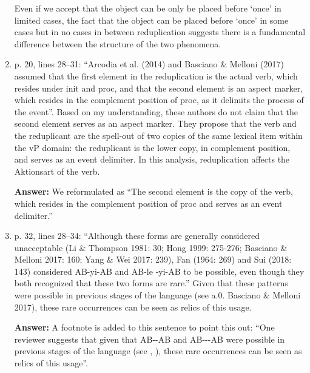 \documentclass[fleqn,twoside]{article}
\begin{document}
\begin{enumerate}
Even if we accept that the object can be only be placed before    `once' in limited cases,
the fact that the object can be placed before    `once' in some cases but in no cases in between reduplication suggests there is a fundamental difference between the structure of the two phenomena.

\item
p. 20, lines 28--31: “Arcodia et al. (2014) and Basciano \& Melloni (2017) assumed that the first
element in the reduplication is the actual verb, which resides under init and proc, and that the
second element is an aspect marker, which resides in the complement position of proc, as it delimits
the process of the event”. Based on my understanding, these authors do not claim that the second
element serves as an aspect marker. They propose that the verb and the reduplicant are the spell-out
of two copies of the same lexical item within the vP domain: the reduplicant is the lower copy, in
complement position, and serves as an event delimiter. In this analysis, reduplication affects the Aktionsart of the verb.

\noindent
\textbf{Answer:} We reformulated as ``The second element is the copy of the verb, which resides in the complement position of proc and serves as an event delimiter.''

\item
p. 32, lines 28--34: “Although these forms are generally considered unacceptable (Li \& Thompson 1981: 30; Hong 1999: 275-276; Basciano \& Melloni 2017: 160; Yang \& Wei 2017: 239), Fan (1964: 269) and Sui (2018: 143) considered AB-yi-AB and AB-le -yi-AB to be possible, even though they both recognized that these two forms are rare.” Given that these patterns were possible in previous stages of the language (see a.0. Basciano \& Melloni 2017), these rare occurrences can be seen as relics of this usage.

\textbf{Answer:} A footnote is added to this sentence to point this out: 
``One reviewer suggests that given that AB--AB and AB---AB were possible in previous stages of the language (see \citealt[15]{Zhang2000}, \citealt[160--161]{BascianoMelloni2017}), these rare occurrences can be seen as relics of this usage''.

\end{enumerate}
\end{document}
